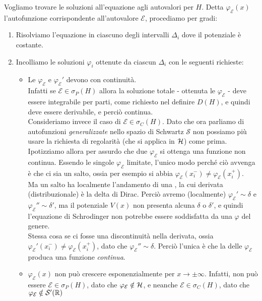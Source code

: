 \documentclass[../../FisicaTeorica.tex]{subfiles}
\begin{document}
Vogliamo trovare le soluzioni all'equazione agli autovalori per $H$. Detta  $\varphi_{\mathcal{E}}(x)$ l'autofunzione corrispondente all'autovalore $\mathcal{E}$, procediamo per gradi:
\begin{enumerate}
\item Risolviamo l'equazione in ciascuno degli intervalli $\Delta_i$ dove il potenziale è costante.
\item Incolliamo le soluzioni $\varphi_i$ ottenute da ciascun $\Delta_i$ con le seguenti richieste:
\begin{itemize}
\item Le $\varphi_\mathcal{E}$ e $\varphi_{\mathcal{E}}'$ devono  con continuità.\\ Infatti se $\mathcal{E}\in \sigma_P(H)$ allora la soluzione totale - ottenuta  le $\varphi_\mathcal{E}$ - deve essere 
integrabile per parti, come richiesto nel definire $D(H)$, e quindi deve essere derivabile, e perciò continua.\\
Consideriamo invece il caso di $\mathcal{E}\in \sigma_C(H)$. Dato che ora parliamo di autofunzioni \textit{generalizzate} nello spazio di Schwartz $\mathcal{S}$ non possiamo più usare la richiesta di regolarità (che si applica in $\mathcal{H}$) come prima. Ipotizziamo allora per assurdo che  due $\varphi_\mathcal{E}$ si ottenga una funzione non continua. Essendo le singole $\varphi_\mathcal{E}$ limitate, l'unico modo perché ciò avvenga è che ci sia un salto, ossia per esempio si abbia $\varphi_{\mathcal{E}}(x_i^-)\neq \varphi_{\mathcal{E}}(x_i^+)$.\\
Ma un salto ha localmente l'andamento di una , la cui derivata (distribuzionale) è la delta di Dirac. Perciò avremo (localmente) $\varphi_{\mathcal{E}}'\sim \delta$ e $\varphi_{\mathcal{E}}''\sim \delta'$, ma il potenziale $V(x)$ non presenta alcuna $\delta$ o $\delta'$, e quindi l'equazione di Schrodinger non potrebbe essere soddisfatta da una $\varphi$ del genere.\\
Stessa cosa se ci fosse una discontinuità nella derivata, ossia $\varphi_\mathcal{E}'(x_i^-)\neq \varphi_\mathcal{E}(x_i^+)$, dato che $\varphi_{\mathcal{E}}''\sim\delta$. Perciò l'unica è che la  delle $\varphi_\mathcal{E}$ produca una funzione \textit{continua}.
\item $\varphi_{\mathcal{E}}(x)$ non può crescere esponenzialmente per $x\to\pm \infty$. Infatti, non può essere $\mathcal{E}\in \sigma_P(H)$, dato che $\varphi_{\mathcal{E}}\notin \mathcal{H}$, e neanche $\mathcal{E}\in \sigma_C(H)$, dato che $\varphi_\mathcal{E}\notin \mathcal{S}'(\mathbb{R})$
\end{itemize} 
\end{enumerate}
\end{document}
